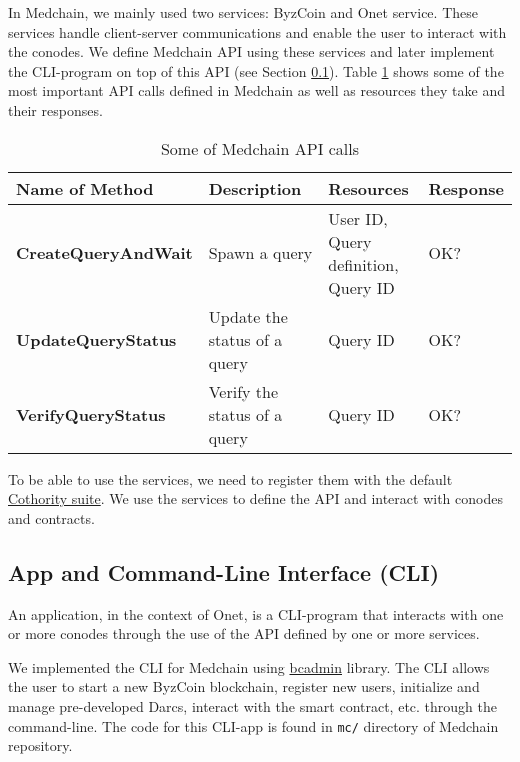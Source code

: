 In Medchain, we mainly used two services: ByzCoin and Onet service. These services handle client-server communications and enable the user to interact with the conodes. We define Medchain API using these services and later implement the CLI-program on top of this API (see Section \ref{impl:cli}). Table \ref{tbl:med_api_calls} shows some of the most important API calls defined in Medchain as well as resources they take and their responses.

\begin{table}[ht]
\centering
\caption{Some of Medchain API calls}
\label{tbl:med_api_calls}
\begin{tabular}{|l|l|l|l|}
\hline
\textbf{Name of Method} & \textbf{Description} & \textbf{Resources} & \textbf{Response}\\
\hline
\textbf{CreateQueryAndWait}    &  Spawn a query & \pbox{20cm}{ User ID, \\ Query definition, \\ Query ID }  & OK?\\
\hline
\textbf{UpdateQueryStatus} & Update the status of a query & Query ID  &  OK? \\
\hline
\textbf{VerifyQueryStatus} & Verify the status of a query & Query ID  &  OK? \\
\hline
 
\end{tabular}
\end{table}

To be able to use the services, we need to register them with the default \href{https://github.com/dedis/cothority/blob/master/suite.go}{Cothority suite}. We use the services to define the API and interact with conodes and contracts.


\subsection{App and Command-Line Interface (CLI)}\label{impl:cli}
An application, in the context of Onet, is a CLI-program that interacts with one or more conodes through the use of the API defined by one or more services. 

We implemented the CLI for Medchain using \href{https://github.com/dedis/cothority/tree/master/byzcoin/bcadmin}{bcadmin} library. The CLI allows the user to start a new ByzCoin blockchain, register new users, initialize and manage pre-developed Darcs, interact with the smart contract, etc. through the command-line. The code for this CLI-app is found in \texttt{mc/} directory of Medchain repository. 

